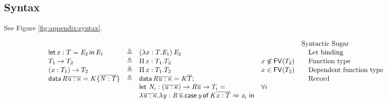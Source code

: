 \subsection{Syntax}
See Figure \ref{fig:appendix:syntax}.
\begin{figure*}[ht]
\centering
\gram{\ottpgm\ottinterrule
\ottdecl\ottinterrule
\ottu\ottinterrule
\ottp\ottinterrule
\otts\ottinterrule
\ottE\ottinterrule
\ottGs}
    \[
    \begin{array}{lllll}
     &&&& \text{Syntactic Sugar} \\
     \mathsf{let} \, \mathit{x}  :  T  =  \mathit{E_{{\mathrm{2}}}} \, \mathsf{in} \, \mathit{E_{{\mathrm{1}}}} & \triangleq & (  \lambda  \mathit{x}  :  T  .  \mathit{E_{{\mathrm{1}}}}  ) \, \mathit{E_{{\mathrm{2}}}} && \quad\text{Let binding} \\
     T_{{\mathrm{1}}}  \rightarrow  T_{{\mathrm{2}}} & \triangleq & \Pi \, \mathit{x}  :  T_{{\mathrm{1}}}  .  T_{{\mathrm{2}}} & x \not \in \mathsf{FV}(T_{{\mathrm{2}}}) & \quad\text{Function type} \\
     (  \mathit{x}  :  T_{{\mathrm{1}}}  )  \rightarrow  T_{{\mathrm{2}}} & \triangleq & \Pi \, \mathit{x}  :  T_{{\mathrm{1}}}  .  T_{{\mathrm{2}}} & x \in \mathsf{FV}(T_{{\mathrm{2}}}) & \quad\text{Dependent function type} \\
     \mathsf{data} \, \mathit{R}  \overline{  \mathit{u}  :  \kappa  }  =  \mathit{K}  \{  \overline{  \mathit{N}  :  T  }  \} & \triangleq &
                    \mathsf{data} \, \mathit{R}  \overline{  \mathit{u}  :  \kappa  }  =  \mathit{K}  \overline{  T  }; && \quad\text{Record} \\
                  &&  \mathsf{let} ~\mathit{N}_i : (  \overline{  \mathit{u}  :  \kappa  }  )  \rightarrow  \mathit{R}    \overline{  \mathit{u}  }  \rightarrow  T_i = & \forall i &  \\
                  && \lambda  \overline{  \mathit{u}  :  \kappa  }  .  \lambda  \mathit{y}  :  \mathit{R} \, \overline{  \mathit{u}  }  .  \mathsf{case} \, \mathit{y} \, \mathsf{of} \, \mathit{K}  \overline{  \mathit{x}  :  T  }  \Rightarrow  \mathit{x}_i~ \mathsf{in}  && \\
    \end{array}
    \]
\caption{Syntax of source language}
\label{fig:appendix:syntax}
\end{figure*}

